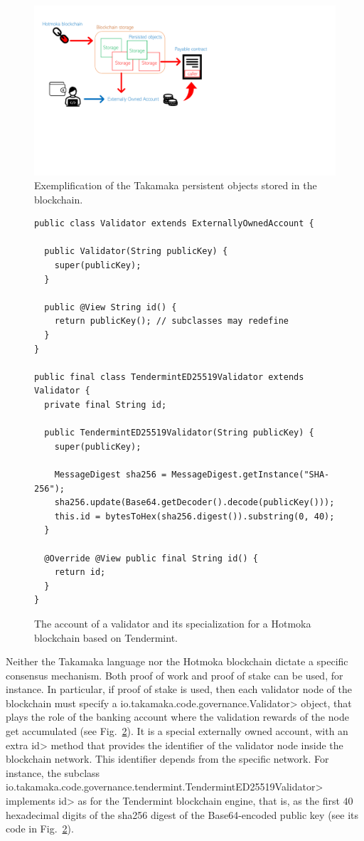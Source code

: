 \begin{figure}[ht]
\centering
\includegraphics[width=.9\linewidth]{figures/takamaka_payable_contract}
\caption{Exemplification of the Takamaka persistent objects stored in the blockchain.}
\label{figure.takamaka_payable_contract}
\end{figure}

\begin{figure}[th]
  \begin{center}
    \begin{lstlisting}[language=Takamaka]
public class Validator extends ExternallyOwnedAccount {

  public Validator(String publicKey) {
    super(publicKey);
  }

  public @View String id() {
    return publicKey(); // subclasses may redefine
  }
}

public final class TendermintED25519Validator extends Validator {
  private final String id;

  public TendermintED25519Validator(String publicKey) {
    super(publicKey);

    MessageDigest sha256 = MessageDigest.getInstance("SHA-256");
    sha256.update(Base64.getDecoder().decode(publicKey()));
    this.id = bytesToHex(sha256.digest()).substring(0, 40);
  }

  @Override @View public final String id() {
    return id;
  }
}
    \end{lstlisting}
  \end{center}
  \caption{The account of a validator and its specialization for a Hotmoka blockchain based on Tendermint.}\label{fig:validator}
\end{figure}

Neither the Takamaka language nor the Hotmoka blockchain dictate a specific consensus mechanism.
Both proof of work and proof of stake can be used, for instance. In particular, if proof of stake
is used, then each validator node of the blockchain must specify a
\<io.takamaka.code.governance.Validator> object, that plays the role of the
banking account where the validation rewards of the node get accumulated (see Fig.~\ref{fig:validator}).
It is a special externally owned account, with an extra \<id> method that provides the
identifier of the validator node inside the blockchain network. This identifier depends from the
specific network.
For instance, the subclass
\<io.takamaka.code.governance.tendermint.TendermintED25519Validator>
implements \<id> as for the Tendermint blockchain engine, that is,
as the first $40$ hexadecimal digits of the sha256 digest of the Base64-encoded public key
(see its code in Fig.~\ref{fig:validator}).
